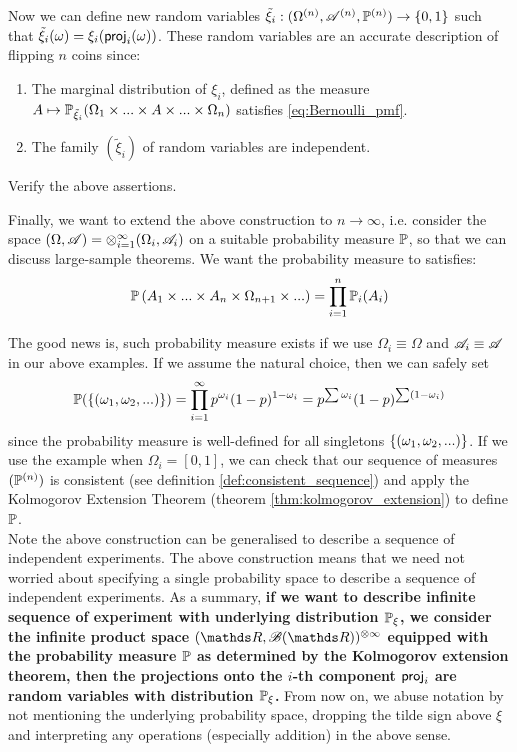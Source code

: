 Now we can define new random variables $\tilde{\xi}_i:(\Omega^{(n)}, \mathcal{A}^{(n)}, \mathbb{P}^{(n)}) \to \left\{ 0,1 \right \}$ such that $\tilde{\xi}_i(\omega) = \xi_i(\mathsf{proj}_i(\omega))$. These random variables are an accurate description of flipping $n$ coins since:
\begin{enumerate}
    \item The marginal distribution of $\xi_i$, defined as the measure $A \mapsto \mathbb{P}_{\tilde{\xi}_i}(\Omega_1 \times ... \times A \times ... \times \Omega_n)$ satisfies \eqref{eq:Bernoulli_pmf}.
    \item The family $(\tilde{\xi}_i)$ of random variables are independent.
\end{enumerate}

\begin{exercise}
Verify the above assertions.
\end{exercise}

Finally, we want to extend the above construction to $n \to \infty$, i.e. consider the space $(\Omega, \mathcal{A}) = \otimes_{i=1}^\infty (\Omega_i, \mathcal{A}_i)$ on a suitable probability measure $\mathbb{P}$, so that we can discuss large-sample theorems. We want the probability measure to satisfies:
\begin{equation} \label{eq:consistent_result}
    \mathbb{P}\left( A_1 \times ... \times A_n \times \Omega_{n+1} \times ... \right) = \prod_{i=1}^n \mathbb{P}_i(A_i)
\end{equation}

The good news is, such probability measure exists if we use $\Omega_i \equiv \Omega$ and $\mathcal{A}_i \equiv \mathcal{A}$ in our above examples. If we assume the natural choice, then we can safely set
\begin{equation*}
    \mathbb{P}(\left\{ (\omega_1,\omega_2,...) \right \}) = \prod_{i=1}^\infty p^{\omega_i} (1-p)^{1-\omega_i} = p^{\sum \omega_i} (1-p)^{\sum (1-\omega_i)}
\end{equation*}
since the probability measure is well-defined for all singletons $\left\{ (\omega_1,\omega_2,...) \right \}$. If we use the example when $\Omega_i = [0,1]$, we can check that our sequence of measures $(\mathbb{P}^{(n)})$ is consistent (see definition \ref{def:consistent_sequence}) and apply the Kolmogorov Extension Theorem (theorem \ref{thm:kolmogorov_extension}) to define $\mathbb{P}$.\\ 

Note the above construction can be generalised to describe a sequence of independent experiments. The above construction means that we need not worried about specifying a single probability space to describe a sequence of independent experiments. As a summary, \textbf{if we want to describe infinite sequence of experiment with underlying distribution $\mathbb{P}_\xi$, we consider the infinite product space $(\R, \B(\R))^{\otimes \infty}$ equipped with the probability measure $\mathbb{P}$ as determined by the Kolmogorov extension theorem, then the projections onto the $i$-th component $\mathsf{proj}_i$ are random variables with distribution $\mathbb{P}_\xi$.} From now on, we abuse notation by not mentioning the underlying probability space, dropping the tilde sign above $\xi$ and interpreting any operations (especially addition) in the above sense.\\

